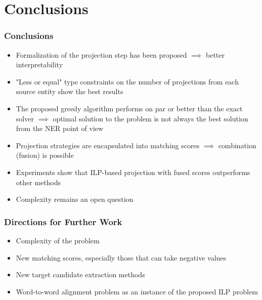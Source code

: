 \documentclass{beamer}
\begin{document}
\section{Conclusions}

\begin{frame}
  \frametitle{Conclusions}

  \begin{itemize}[<+->]
    \item Formalization of the projection step has been proposed \( \implies \) better interpretability
    \item "Less or equal" type constraints on the number of projections from each source entity show the best results
    \item The proposed greedy algorithm performs on par or better than the exact solver \( \implies \) optimal solution to the problem is not always the best solution from the NER point of view
    \item Projection strategies are encapsulated into matching scores \( \implies \)  combination (fusion) is possible
    \item Experiments show that ILP-based projection with fused scores outperforms other methods
    \item Complexity remains an open question
  \end{itemize}
\end{frame}

\begin{frame}
  \frametitle{Directions for Further Work}

  \begin{itemize}
    \item Complexity of the problem
    \item New matching scores, especially those that can take negative values
    \item New target candidate extraction methods
    \item Word-to-word alignment problem as an instance of the proposed ILP problem
  \end{itemize}
\end{frame}



%   
%   
\end{document}
